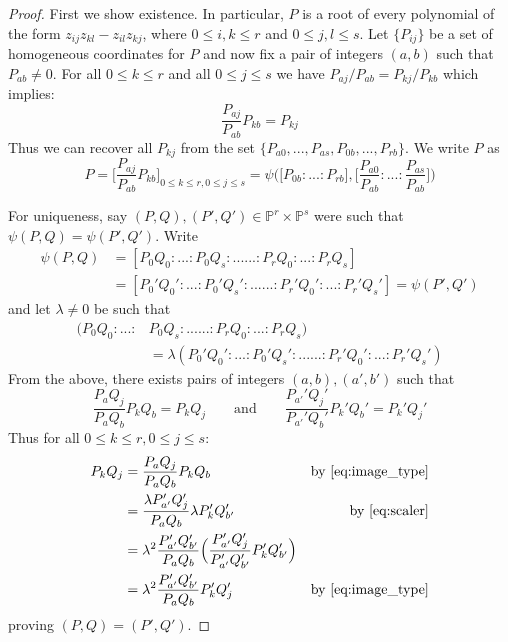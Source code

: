 \documentclass[12pt]{article}
\theoremstyle{plain}
\theoremstyle{definition}
\newcommand{\bb}[1]{\mathbb{#1}}
\begin{document}
\begin{proof}
First we show existence. In particular, $P$ is a root of every polynomial of the form $z_{ij}z_{kl} - z_{il}z_{kj}$, where $0\leq i,k\leq r$ and $0\leq j,l\leq s$. Let $\lbrace P_{ij}\rbrace$ be a set of homogeneous coordinates for $P$ and now fix a pair of integers $(a,b)$ such that $P_{ab} \neq 0$. For all $0 \leq k\leq r$ and all $0 \leq j \leq s$ we have $P_{aj}/P_{ab} = P_{kj}/P_{kb}$ which implies:
\[\frac{P_{aj}}{P_{ab}}P_{kb} = P_{kj}\]
Thus we can recover all $P_{kj}$ from the set $\lbrace P_{a0},...,P_{as},P_{0b},...,P_{rb}\rbrace$. We write $P$ as
\[P = \Big[\frac{P_{aj}}{P_{ab}}P_{kb}\Big]_{0 \leq k \leq r, 0 \leq j \leq s} = \psi\Big(\big[P_{0b}:...:P_{rb}\big], \big[\frac{P_{a0}}{P_{ab}}:...:\frac{P_{as}}{P_{ab}}\big]\Big)\]

For uniqueness, say $(P,Q),(P',Q') \in \bb{P}^r \times \bb{P}^s$ were such that $\psi(P,Q) = \psi(P',Q')$. Write
\begin{align*}
    \psi(P,Q) &= [P_0Q_0:...:P_0Q_s:......:P_rQ_0:...:P_rQ_s]\\
    &= [P_0'Q_0':...:P_0'Q_s':......:P_r'Q_0':...:P_r'Q_s'] = \psi(P',Q')
\end{align*}
and let $\lambda \neq 0$ be such that 
\begin{align}\label{eq:scaler}
(P_0Q_0:...:&P_0Q_s:......:P_rQ_0:...:P_rQ_s)\\
&=\lambda (P_0'Q_0':...:P_0'Q_s':......:P_r'Q_0':...:P_r'Q_s')
\end{align}
From the above, there exists pairs of integers $(a,b),(a',b')$ such that
\begin{equation}\label{eq:image_type}
    \frac{P_{a}Q_j}{P_{a}Q_b}P_kQ_b = P_kQ_j\qquad\text{and}\qquad \frac{P_{a'}'Q_j'}{P_{a'}'Q_b'}P_k'Q_b' = P_k'Q_j'
\end{equation}
Thus for all $0 \leq k \leq r, 0 \leq j \leq s$:
\begin{align*}
    P_kQ_j &= \frac{P_{a}Q_j}{P_{a}Q_b}P_kQ_b & \text{by }\eqref{eq:image_type}\\
    &= \frac{\lambda P'_{a'}Q'_j}{P_{a}Q_b}\lambda P'_kQ_{b'}' & \text{by }\eqref{eq:scaler}\\
    &= \lambda^2 \frac{P_{a'}'Q_{b'}'}{P_{a}Q_{b}} \Big(\frac{P_{a'}'Q_j'}{P_{a'}'Q_{b'}'}P_k'Q_{b'}'\Big)\\
    &= \lambda^2 \frac{P_{a'}'Q_{b'}'}{P_{a}Q_{b}} P_k'Q_j' & \text{by }\eqref{eq:image_type}
\end{align*}
proving $(P,Q) = (P',Q')$.
\end{proof}
\end{document}

